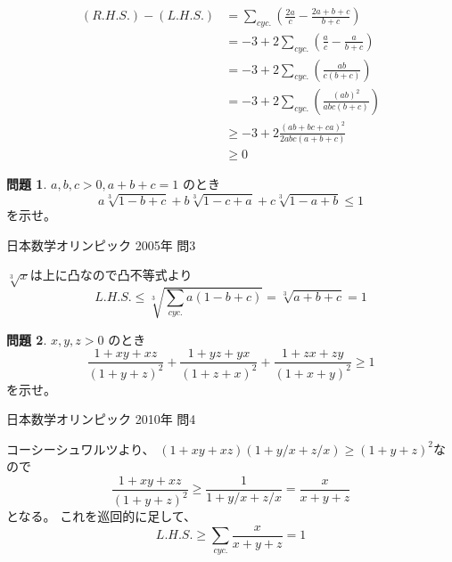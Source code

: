 \documentclass[uplatex, a5paper]{jsarticle}
\makeatletter
\theoremstyle{definition}
\newtheorem{prob}{問題}
\renewenvironment{proof}[1][\proofname]{
  \pushQED{\qed}%
  \normalfont \topsep6\p@\@plus6\p@\relax
  \trivlist
  \item[\hskip\labelsep
    #1\@addpunct{\textbf{.}}]\ignorespaces
}{%
  \popQED\endtrivlist\@endpefalse
}
\providecommand{\proofname}{証明}
\newcommand{\lhs }{ L.H.S. }
\newcommand{\rhs }{ R.H.S. }
\def\qed{\hfill $\Box$}
\makeatother
\begin{document}
\begin{proof}
  \begin{align*}
    ( \rhs ) - ( \lhs ) &= \sum_{cyc.} \left( \frac{2a}{c} - \frac{2a+b+c}{b+c} \right) \\
    &= -3 + 2\sum_{cyc.} \left( \frac{a}{c} - \frac{a}{b+c} \right) \\
    &= -3 + 2\sum_{cyc.} \left( \frac{ab}{c(b+c)} \right) \\
    &= -3 + 2\sum_{cyc.} \left( \frac{(ab)^2}{ abc(b+c)} \right) \\
    &\geq -3 + 2\frac{ ( ab+bc+ca )^2 }{ 2abc(a+b+c) } \\
    &\geq 0
  \end{align*}
\end{proof}












\newpage

\begin{prob}
  \(a,b,c>0,a+b+c=1\)
  のとき
  \[
  a\sqrt[3]{1-b+c} + b\sqrt[3]{1-c+a} + c\sqrt[3]{1-a+b} \leq 1
  \]
  を示せ。
  \begin{flushright}
    日本数学オリンピック 2005年 問3
  \end{flushright}
\end{prob}


\begin{proof}
  \(\sqrt[3]{x}\)は上に凸なので凸不等式より
  \[
  \lhs \leq \sqrt[3]{ \sum_{cyc.} a(1-b+c) } = \sqrt[3]{ a+b+c } =1
  \]
\end{proof}










\newpage

\begin{prob}
  \(x,y,z>0\)
  のとき
  \[
  \frac{1+xy+xz}{(1+y+z)^2} + \frac{1+yz+yx}{(1+z+x)^2} + \frac{1+zx+zy}{(1+x+y)^2} \geq 1
  \]
  を示せ。
  \begin{flushright}
    日本数学オリンピック 2010年 問4
  \end{flushright}
\end{prob}


\begin{proof}
  コーシーシュワルツより、
  \((1+xy+xz)(1+y/x+z/x)\geq (1+y+z)^2\)なので
  \[
  \frac{1+xy+xz}{(1+y+z)^2} \geq \frac{1}{1+y/x+z/x } = \frac{x}{x+y+z}
  \]
  となる。
  これを巡回的に足して、
  \[
  \lhs \geq \sum_{cyc.} \frac{x}{x+y+z} = 1
  \]
\end{proof}
\end{document}
